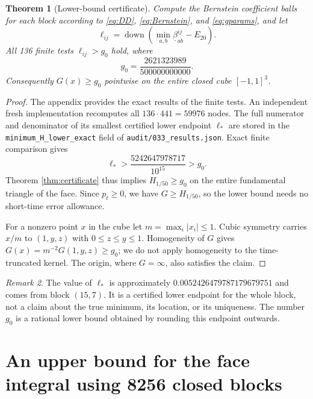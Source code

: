 \documentclass[11pt,a4paper]{article}
\newtheorem{theorem}{Theorem}[section]
\theoremstyle{definition}\newtheorem{definition}[theorem]{Definition}
\theoremstyle{remark}\newtheorem{remark}[theorem]{Remark}
\newcommand{\abs}[1]{\left|#1\right|}
\newcommand{\src}[1]{\nolinkurl{#1}}
\begin{document}
\begin{theorem}[Lower-bound certificate]\label{thm:g}
Compute the Bernstein coefficient balls for each block according to \eqref{eq:DD}, \eqref{eq:Bernstein}, and \eqref{eq:gparams}, and let
\[
 \ell_{ij}=\operatorname{down}\!\left(
  \min_{a,b}\underline\beta^{ij}_{ab}-E_{20}\right).
\]
All 136 finite tests $\ell_{ij}>g_0$ hold, where
\begin{equation}\label{eq:g0}
 g_0=\frac{2621323989}{500000000000}.
\end{equation}
Consequently $G(x)\ge g_0$ pointwise on the entire closed cube $[-1,1]^3$.
\end{theorem}
\begin{proof}
The appendix provides the exact results of the finite tests. An independent fresh implementation recomputes all $136\cdot441=59976$ nodes. The full numerator and denominator of its smallest certified lower endpoint $\ell_*$ are stored in the
\src{minimum_H_lower_exact} field of \src{audit/033_results.json}.
Exact finite comparison gives
\[
 \ell_*>\frac{5242647978717}{10^{15}}>g_0.
\]
Theorem \ref{thm:certificate} thus implies $H_{1/50}\ge g_0$ on the entire fundamental triangle of the face. Since $p_t\ge0$, we have $G\ge H_{1/50}$, so the lower bound needs no short-time error allowance.

For a nonzero point $x$ in the cube let $m=\max_i\abs{x_i}\le1$. Cubic symmetry carries $x/m$ to $(1,y,z)$ with $0\le z\le y\le1$. Homogeneity of $G$ gives
$G(x)=m^{-2}G(1,y,z)\ge g_0$; we do not apply homogeneity to the time-truncated kernel. The origin, where $G=\infty$, also satisfies the claim.
\end{proof}

\begin{remark}
The value of $\ell_*$ is approximately $0.0052426479787179679751$ and comes from block $(15,7)$. It is a certified lower endpoint for the whole block, not a claim about the true minimum, its location, or its uniqueness. The number $g_0$ is a rational lower bound obtained by rounding this endpoint outwards.
\end{remark}

\section{An upper bound for the face integral using 8256 closed blocks}
\end{document}

